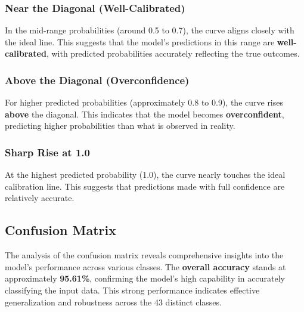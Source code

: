\subsubsection{Near the Diagonal (Well-Calibrated)}
In the mid-range probabilities (around 0.5 to 0.7), the curve aligns closely with the ideal line. This suggests that the model's predictions in this range are \textbf{well-calibrated}, with predicted probabilities accurately reflecting the true outcomes.

\subsubsection{Above the Diagonal (Overconfidence)}
For higher predicted probabilities (approximately 0.8 to 0.9), the curve rises \textbf{above} the diagonal. This indicates that the model becomes \textbf{overconfident}, predicting higher probabilities than what is observed in reality.

\subsubsection{Sharp Rise at 1.0}
At the highest predicted probability (1.0), the curve nearly touches the ideal calibration line. This suggests that predictions made with full confidence are relatively accurate.

\subsection{Confusion Matrix}

The analysis of the confusion matrix reveals comprehensive insights into the model's performance across various classes. The \textbf{overall accuracy} stands at approximately \textbf{95.61\%}, confirming the model's high capability in accurately classifying the input data. This strong performance indicates effective generalization and robustness across the 43 distinct classes.

